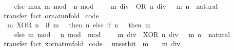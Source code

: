 \begin{isabellebody}
\ \ \ \ else\ max\ {\isacharparenleft}{\kern0pt}m\ mod\ {}{\isacharparenright}{\kern0pt}\ {\isacharparenleft}{\kern0pt}n\ mod\ {}{\isacharparenright}{\kern0pt}\ {\isacharplus}{\kern0pt}\ {}\ {\isacharasterisk}{\kern0pt}\ {\isacharparenleft}{\kern0pt}{\isacharparenleft}{\kern0pt}m\ div\ {}{\isacharparenright}{\kern0pt}\ OR\ {\isacharparenleft}{\kern0pt}n\ div\ {}{\isacharparenright}{\kern0pt}{\isacharparenright}{\kern0pt}{\isacharparenright}{\kern0pt}{\isacartoucheclose}\ \ m\ n\ {\isacharcolon}{\kern0pt}{\isacharcolon}{\kern0pt}\ natural\isanewline
%
\isadelimproof
\ \ %
\endisadelimproof
%
\isatagproof
{}\isamarkupfalse%
\ transfer\ {\isacharparenleft}{\kern0pt}fact\ or{\isacharunderscore}{\kern0pt}nat{\isacharunderscore}{\kern0pt}unfold{\isacharparenright}{\kern0pt}%
\endisatagproof
{\isafoldproof}%
%
\isadelimproof
\isanewline
%
\endisadelimproof
\isanewline
{}\isamarkupfalse%
\ {\isacharbrackleft}{\kern0pt}code{\isacharbrackright}{\kern0pt}{\isacharcolon}{\kern0pt}\isanewline
\ \ {\isacartoucheopen}m\ XOR\ n\ {\isacharequal}{\kern0pt}\ {\isacharparenleft}{\kern0pt}if\ m\ {\isacharequal}{\kern0pt}\ {}\ then\ n\ else\ if\ n\ {\isacharequal}{\kern0pt}\ {}\ then\ m\isanewline
\ \ \ \ else\ {\isacharparenleft}{\kern0pt}m\ mod\ {}\ {\isacharplus}{\kern0pt}\ n\ mod\ {}{\isacharparenright}{\kern0pt}\ mod\ {}\ {\isacharplus}{\kern0pt}\ {}\ {\isacharasterisk}{\kern0pt}\ {\isacharparenleft}{\kern0pt}{\isacharparenleft}{\kern0pt}m\ div\ {}{\isacharparenright}{\kern0pt}\ XOR\ {\isacharparenleft}{\kern0pt}n\ div\ {}{\isacharparenright}{\kern0pt}{\isacharparenright}{\kern0pt}{\isacharparenright}{\kern0pt}{\isacartoucheclose}\ \ m\ n\ {\isacharcolon}{\kern0pt}{\isacharcolon}{\kern0pt}\ natural\isanewline
%
\isadelimproof
\ \ %
\endisadelimproof
%
\isatagproof
{}\isamarkupfalse%
\ transfer\ {\isacharparenleft}{\kern0pt}fact\ xor{\isacharunderscore}{\kern0pt}nat{\isacharunderscore}{\kern0pt}unfold{\isacharparenright}{\kern0pt}%
\endisatagproof
{\isafoldproof}%
%
\isadelimproof
\isanewline
%
\endisadelimproof
\isanewline
{}\isamarkupfalse%
\ {\isacharbrackleft}{\kern0pt}code{\isacharbrackright}{\kern0pt}{\isacharcolon}{\kern0pt}\isanewline
\ \ {\isacartoucheopen}unset{\isacharunderscore}{\kern0pt}bit\ {}\ m\ {\isacharequal}{\kern0pt}\ {}\ {\isacharasterisk}{\kern0pt}\ {\isacharparenleft}{\kern0pt}m\ div\ {}{\isacharparenright}{\kern0pt}{\isacartoucheclose}\isanewline

\end{isabellebody}

